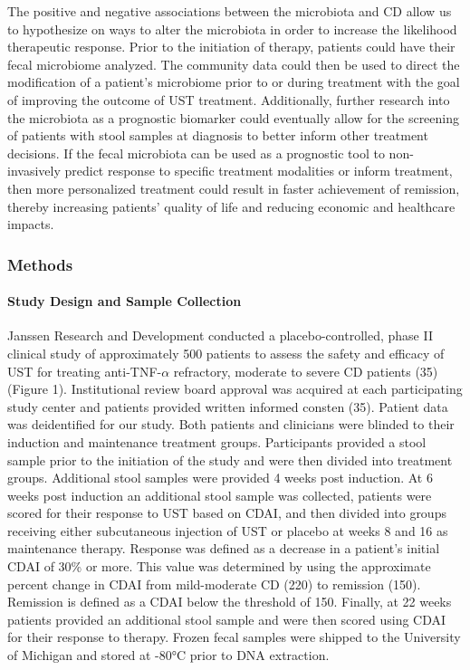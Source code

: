 \documentclass[11pt,]{article}
\let\oldparagraph\paragraph
\renewcommand{\paragraph}[1]{\oldparagraph{#1}\mbox{}}
\begin{document}
The positive and negative associations between the microbiota and CD
allow us to hypothesize on ways to alter the microbiota in order to
increase the likelihood therapeutic response. Prior to the initiation of
therapy, patients could have their fecal microbiome analyzed. The
community data could then be used to direct the modification of a
patient's microbiome prior to or during treatment with the goal of
improving the outcome of UST treatment. Additionally, further research
into the microbiota as a prognostic biomarker could eventually allow for
the screening of patients with stool samples at diagnosis to better
inform other treatment decisions. If the fecal microbiota can be used as
a prognostic tool to non-invasively predict response to specific
treatment modalities or inform treatment, then more personalized
treatment could result in faster achievement of remission, thereby
increasing patients' quality of life and reducing economic and
healthcare impacts.

\newpage

\subsubsection{Methods}\label{methods}

\paragraph{Study Design and Sample
Collection}\label{study-design-and-sample-collection}

Janssen Research and Development conducted a placebo-controlled, phase
II clinical study of approximately 500 patients to assess the safety and
efficacy of UST for treating anti-TNF-\({\alpha}\) refractory, moderate
to severe CD patients (35) (Figure 1). Institutional review board
approval was acquired at each participating study center and patients
provided written informed consten (35). Patient data was deidentified
for our study. Both patients and clinicians were blinded to their
induction and maintenance treatment groups. Participants provided a
stool sample prior to the initiation of the study and were then divided
into treatment groups. Additional stool samples were provided 4 weeks
post induction. At 6 weeks post induction an additional stool sample was
collected, patients were scored for their response to UST based on CDAI,
and then divided into groups receiving either subcutaneous injection of
UST or placebo at weeks 8 and 16 as maintenance therapy. Response was
defined as a decrease in a patient's initial CDAI of 30\% or more. This
value was determined by using the approximate percent change in CDAI
from mild-moderate CD (220) to remission (150). Remission is defined as
a CDAI below the threshold of 150. Finally, at 22 weeks patients
provided an additional stool sample and were then scored using CDAI for
their response to therapy. Frozen fecal samples were shipped to the
University of Michigan and stored at -80°C prior to DNA extraction.
\end{document}
